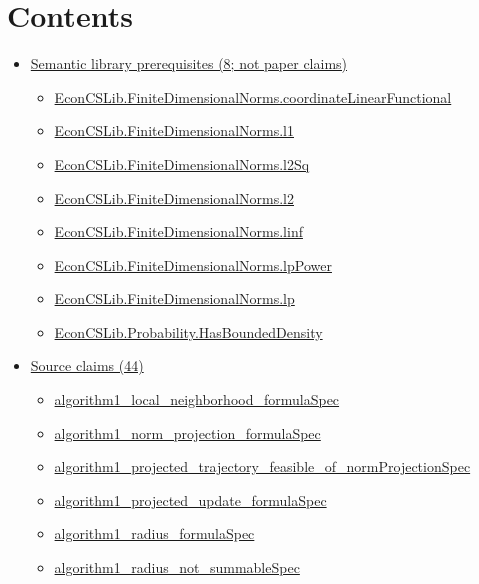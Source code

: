 \documentclass[10pt]{article}
\begin{document}
\section*{Contents}
\begin{itemize}[leftmargin=1.2em]
\item \hyperlink{library-section-7af9edee67c68478}{Semantic library prerequisites (8; not paper claims)}
\begin{itemize}[leftmargin=1.2em]
\item \hyperlink{library-prerequisite-72a4fa8a1ca104da}{EconCSLib.FiniteDimensionalNorms.coordinateLinearFunctional}
\item \hyperlink{library-prerequisite-3c892f92f5d89bc4}{EconCSLib.FiniteDimensionalNorms.l1}
\item \hyperlink{library-prerequisite-9808eaf6fd3c24d8}{EconCSLib.FiniteDimensionalNorms.l2Sq}
\item \hyperlink{library-prerequisite-bef8f23ca7c4cf59}{EconCSLib.FiniteDimensionalNorms.l2}
\item \hyperlink{library-prerequisite-8d70eb5c3f7e8c76}{EconCSLib.FiniteDimensionalNorms.linf}
\item \hyperlink{library-prerequisite-8131285d8f3e27f4}{EconCSLib.FiniteDimensionalNorms.lpPower}
\item \hyperlink{library-prerequisite-c6e15042a716d8a0}{EconCSLib.FiniteDimensionalNorms.lp}
\item \hyperlink{library-prerequisite-851b58af0cd102a3}{EconCSLib.Probability.HasBoundedDensity}
\end{itemize}
\item \hyperlink{source-section-f10b5f68e4acf3dc}{Source claims (44)}
\begin{itemize}[leftmargin=1.2em]
\item \hyperlink{source-claim-db9c5a5fe969e1de}{algorithm1\_local\_neighborhood\_formulaSpec}
\item \hyperlink{source-claim-8457e0d182fe249b}{algorithm1\_norm\_projection\_formulaSpec}
\item \hyperlink{source-claim-9a151b770a276076}{algorithm1\_projected\_trajectory\_feasible\_of\_normProjectionSpec}
\item \hyperlink{source-claim-cef46a3dab6bb18f}{algorithm1\_projected\_update\_formulaSpec}
\item \hyperlink{source-claim-64105395dd6a3dd4}{algorithm1\_radius\_formulaSpec}
\item \hyperlink{source-claim-6bcb00a1cec69ec9}{algorithm1\_radius\_not\_summableSpec}

\end{itemize}
\end{itemize}
\end{document}
